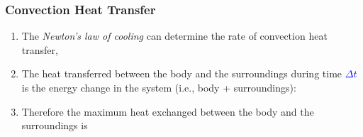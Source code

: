 \documentclass[10pt,compress]{beamer}
\newcommand{\blue}{\textcolor{blue}}
\begin{document}
\begin{frame}
 \frametitle{Convection Heat Transfer}
   \begin{enumerate}%
     \item<1-> The {\it Newton's law of cooling} can determine the rate of convection heat transfer,
          \visible<1->{\blue{\begin{equation}
              \dot{Q}(t) = hA_{s}\left[T(t) - T_{\infty}\right] \hspace{1cm} \mathbf{(W)}
          \end{equation}}}
     \item<2-> The heat transferred between the body and the surroundings during time \blue{$\Delta t$} is the energy change in the system (i.e., body + surroundings):
     \item<3-> Therefore the maximum heat exchanged between the body and the surroundings is
   \end{enumerate}
\end{frame}
\end{document}

